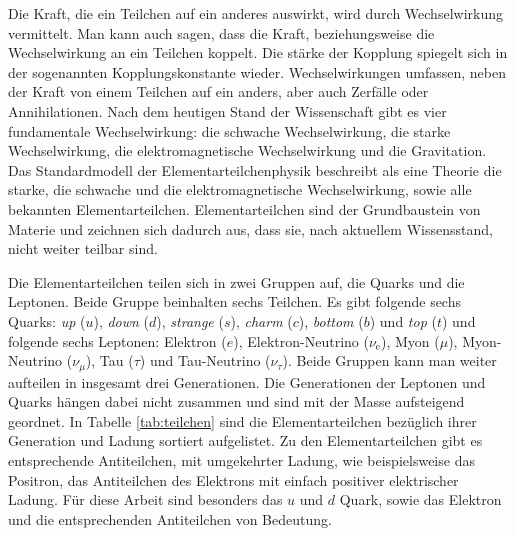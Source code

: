 Die Kraft, die ein Teilchen auf ein anderes auswirkt, wird durch Wechselwirkung vermittelt. Man kann auch sagen, dass die Kraft, beziehungsweise die Wechselwirkung an ein Teilchen koppelt. Die st\"arke der Kopplung spiegelt sich in der sogenannten Kopplungskonstante wieder.  Wechselwirkungen umfassen, neben der Kraft von einem Teilchen auf ein anders, aber auch Zerf\"alle oder Annihilationen. Nach dem heutigen Stand der Wissenschaft gibt es vier fundamentale Wechselwirkung: die schwache Wechselwirkung, die starke Wechselwirkung, die elektromagnetische Wechselwirkung und die Gravitation. Das Standardmodell der Elementarteilchenphysik beschreibt als eine Theorie die starke, die schwache und die elektromagnetische Wechselwirkung, sowie alle bekannten Elementarteilchen.
Elementarteilchen sind der Grundbaustein von Materie und zeichnen sich dadurch aus, dass sie, nach aktuellem Wissensstand, nicht weiter teilbar sind.

Die Elementarteilchen teilen sich in zwei Gruppen auf, die Quarks und die Leptonen. Beide Gruppe beinhalten sechs Teilchen. Es gibt folgende sechs Quarks: \textit{up} ($u$), \textit{down} ($d$), \textit{strange} ($s$), \textit{charm} ($c$), \textit{bottom} ($b$) und \textit{top} ($t$) und folgende sechs Leptonen: Elektron ($e$), Elektron-Neutrino ($\nu_\text{e}$), Myon ($\mu$), Myon-Neutrino ($\nu_{\mu}$), Tau ($\tau$) und Tau-Neutrino ($\nu_{\tau}$). Beide Gruppen kann man weiter aufteilen in insgesamt drei Generationen. Die Generationen der Leptonen und Quarks h\"angen dabei nicht zusammen und sind mit der Masse aufsteigend geordnet. In Tabelle \ref{tab:teilchen} sind die Elementarteilchen bez\"uglich ihrer Generation und Ladung sortiert aufgelistet. Zu den Elementarteilchen gibt es entsprechende Antiteilchen, mit umgekehrter Ladung, wie beispielsweise das Positron, das Antiteilchen des Elektrons mit einfach positiver elektrischer Ladung.
F\"ur diese Arbeit sind besonders das $u$ und $d$ Quark, sowie das Elektron und die entsprechenden Antiteilchen von Bedeutung.

